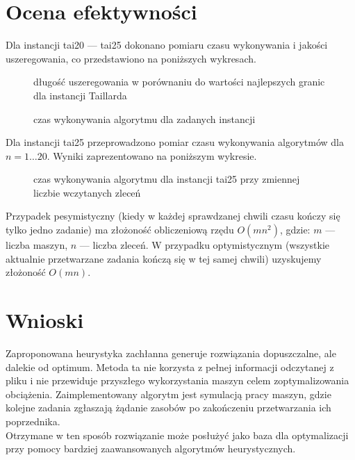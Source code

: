 \documentclass[10pt,a4paper]{article}
\begin{document}
\section{Ocena efektywności}
Dla instancji tai20 --- tai25 dokonano pomiaru czasu wykonywania i jakości uszeregowania, co przedstawiono na poniższych wykresach.

\begin{figure}[H]
\centering
\caption{długość uszeregowania w porównaniu do wartości najlepszych granic dla instancji Taillarda}
\label{eff11}
\end{figure}

\begin{figure}[H]
    \centering
    \caption{czas wykonywania algorytmu dla zadanych instancji}
    \label{eff12}
\end{figure}

 
Dla instancji tai25 przeprowadzono pomiar czasu wykonywania algorytmów dla $n=1\ldots20$. Wyniki zaprezentowano na poniższym wykresie.

\begin{figure}[H]
    \centering
    \caption{czas wykonywania algorytmu dla instancji tai25 przy zmiennej liczbie wczytanych zleceń}
\end{figure}

Przypadek pesymistyczny (kiedy w każdej sprawdzanej chwili czasu kończy się tylko jedno zadanie) ma złożoność obliczeniową rzędu $O(mn^2)$, gdzie: $m$ --- liczba maszyn, $n$ --- liczba zleceń. W przypadku optymistycznym (wszystkie aktualnie przetwarzane zadania kończą się w tej samej chwili) uzyskujemy złożoność $O(mn)$. 
    
\section{Wnioski}
Zaproponowana heurystyka zachłanna generuje rozwiązania dopuszczalne, ale dalekie od optimum. Metoda ta nie korzysta z pełnej informacji odczytanej z pliku i nie przewiduje przyszłego wykorzystania maszyn celem zoptymalizowania obciążenia. Zaimplementowany algorytm jest symulacją pracy maszyn, gdzie kolejne zadania zgłaszają żądanie zasobów po zakończeniu przetwarzania ich poprzednika.\\
Otrzymane w ten sposób rozwiązanie może posłużyć jako baza dla optymalizacji przy pomocy bardziej zaawansowanych algorytmów heurystycznych.
\end{document}
